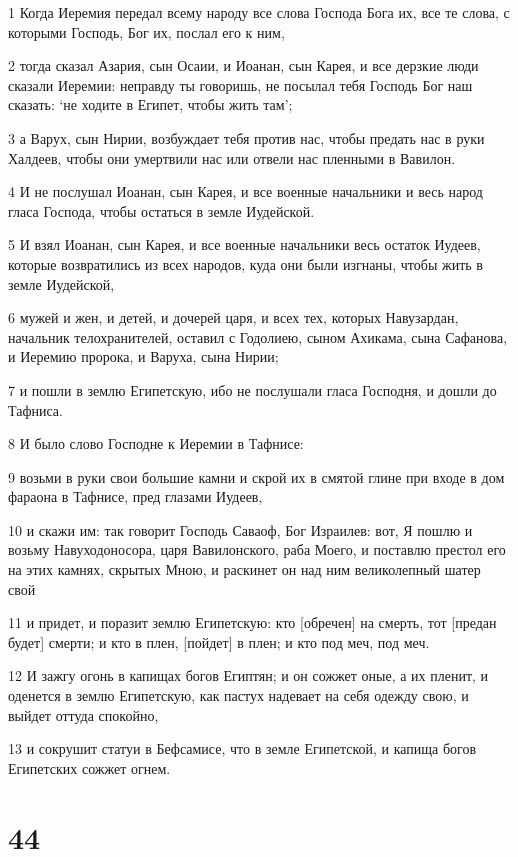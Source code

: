 \par 1 Когда Иеремия передал всему народу все слова Господа Бога их, все те слова, с которыми Господь, Бог их, послал его к ним,
\par 2 тогда сказал Азария, сын Осаии, и Иоанан, сын Карея, и все дерзкие люди сказали Иеремии: неправду ты говоришь, не посылал тебя Господь Бог наш сказать: `не ходите в Египет, чтобы жить там';
\par 3 а Варух, сын Нирии, возбуждает тебя против нас, чтобы предать нас в руки Халдеев, чтобы они умертвили нас или отвели нас пленными в Вавилон.
\par 4 И не послушал Иоанан, сын Карея, и все военные начальники и весь народ гласа Господа, чтобы остаться в земле Иудейской.
\par 5 И взял Иоанан, сын Карея, и все военные начальники весь остаток Иудеев, которые возвратились из всех народов, куда они были изгнаны, чтобы жить в земле Иудейской,
\par 6 мужей и жен, и детей, и дочерей царя, и всех тех, которых Навузардан, начальник телохранителей, оставил с Годолиею, сыном Ахикама, сына Сафанова, и Иеремию пророка, и Варуха, сына Нирии;
\par 7 и пошли в землю Египетскую, ибо не послушали гласа Господня, и дошли до Тафниса.
\par 8 И было слово Господне к Иеремии в Тафнисе:
\par 9 возьми в руки свои большие камни и скрой их в смятой глине при входе в дом фараона в Тафнисе, пред глазами Иудеев,
\par 10 и скажи им: так говорит Господь Саваоф, Бог Израилев: вот, Я пошлю и возьму Навуходоносора, царя Вавилонского, раба Моего, и поставлю престол его на этих камнях, скрытых Мною, и раскинет он над ним великолепный шатер свой
\par 11 и придет, и поразит землю Египетскую: кто [обречен] на смерть, тот [предан будет] смерти; и кто в плен, [пойдет] в плен; и кто под меч, под меч.
\par 12 И зажгу огонь в капищах богов Египтян; и он сожжет оные, а их пленит, и оденется в землю Египетскую, как пастух надевает на себя одежду свою, и выйдет оттуда спокойно,
\par 13 и сокрушит статуи в Бефсамисе, что в земле Египетской, и капища богов Египетских сожжет огнем.

\chapter{44}

